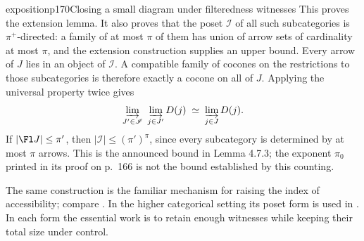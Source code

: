 \begin{dcomment}{exposition}{p170}{Closing a small diagram under filteredness witnesses}
This proves the extension lemma. It also proves that the poset $\mathscr I$ of all such subcategories is $\pi^+$-directed: a family of at most $\pi$ of them has union of arrow sets of cardinality at most $\pi$, and the extension construction supplies an upper bound. Every arrow of $J$ lies in an object of $\mathscr I$. A compatible family of cocones on the restrictions to those subcategories is therefore exactly a cocone on all of $J$. Applying the universal property twice gives
\[
 \varinjlim_{J'\in\mathscr I}\ \varinjlim_{j\in J'}D(j)
 \;\simeq\;\varinjlim_{j\in J}D(j).
\]
If $|\Fl J|\leq\pi'$, then $|\mathscr I|\leq(\pi')^\pi$, since every subcategory is determined by at most $\pi$ arrows. This is the announced bound in Lemma 4.7.3; the exponent $\pi_0$ printed in its proof on p.~166 is not the bound established by this counting.

The same construction is the familiar mechanism for raising the index of accessibility; compare \citet[Theorem 3.4]{Vasey2020Accessible}. In the higher categorical setting its poset form is used in \citet[Lemma 5.4.2.8 and Proposition 5.4.2.9]{Lurie2009HTT}. In each form the essential work is to retain enough witnesses while keeping their total size under control.
\end{dcomment}

